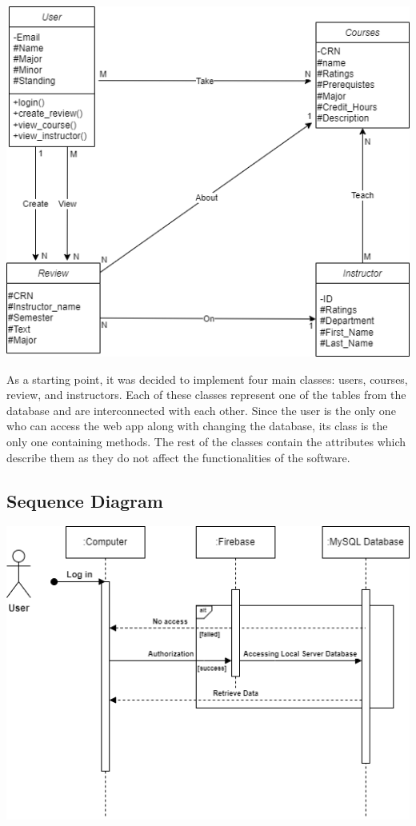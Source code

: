 \documentclass{article}
\begin{document}
\begin{center}
\includegraphics[scale=0.8]{../../Milestone_2/Diagrams/ClassDiagram.png} 
\end{center}

\quad As a starting point, it was decided to implement four main classes: users, courses, review, and instructors. Each of these classes represent one of the tables from the database and are interconnected with each other. Since the user is the only one who can access the web app along with changing the database, its class is the only one containing methods. The rest of the classes contain the attributes which describe them as they do not affect the functionalities of the software. 


\subsection{Sequence Diagram} 
\begin{center}
\includegraphics[scale=0.8]{../../Milestone_2/Diagrams/SequenceDiagram.png} 
\end{center} 
\end{document}
